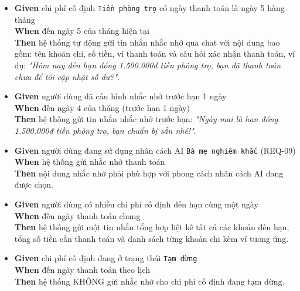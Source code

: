 \begin{itemize}
\item \textbf{Given} chi phí cố định \texttt{Tiền phòng trọ} có ngày thanh toán là ngày 5 hàng tháng  \\ \hspace*{1.5em}  \textbf{When} đến ngày 5 của tháng hiện tại  \\ \hspace*{1.5em}  \textbf{Then} hệ thống tự động gửi tin nhắn nhắc nhở qua chat với nội dung bao gồm: tên khoản chi, số tiền, ví thanh toán và câu hỏi xác nhận thanh toán, ví dụ: \textit{"Hôm nay đến hạn đóng 1.500.000đ tiền phòng trọ, bạn đã thanh toán chưa để tôi cập nhật số dư?"}.
\item \textbf{Given} người dùng đã cấu hình nhắc nhở trước hạn 1 ngày  \\ \hspace*{1.5em}  \textbf{When} đến ngày 4 của tháng (trước hạn 1 ngày)  \\ \hspace*{1.5em}  \textbf{Then} hệ thống gửi tin nhắn nhắc nhở trước hạn: \textit{"Ngày mai là hạn đóng 1.500.000đ tiền phòng trọ, bạn chuẩn bị sẵn nhé!"}.
\item \textbf{Given} người dùng đang sử dụng nhân cách AI \texttt{Bà mẹ nghiêm khắc} (REQ-09)  \\ \hspace*{1.5em}  \textbf{When} hệ thống gửi nhắc nhở thanh toán  \\ \hspace*{1.5em}  \textbf{Then} nội dung nhắc nhở phải phù hợp với phong cách nhân cách AI đang được chọn.
\item \textbf{Given} người dùng có nhiều chi phí cố định đến hạn cùng một ngày  \\ \hspace*{1.5em}  \textbf{When} đến ngày thanh toán chung  \\ \hspace*{1.5em}  \textbf{Then} hệ thống gửi một tin nhắn tổng hợp liệt kê tất cả các khoản đến hạn, tổng số tiền cần thanh toán và danh sách từng khoản chi kèm ví tương ứng.
\item \textbf{Given} chi phí cố định đang ở trạng thái \texttt{Tạm dừng}  \\ \hspace*{1.5em}  \textbf{When} đến ngày thanh toán theo lịch  \\ \hspace*{1.5em}  \textbf{Then} hệ thống KHÔNG gửi nhắc nhở cho chi phí cố định đang tạm dừng.

\end{itemize}
